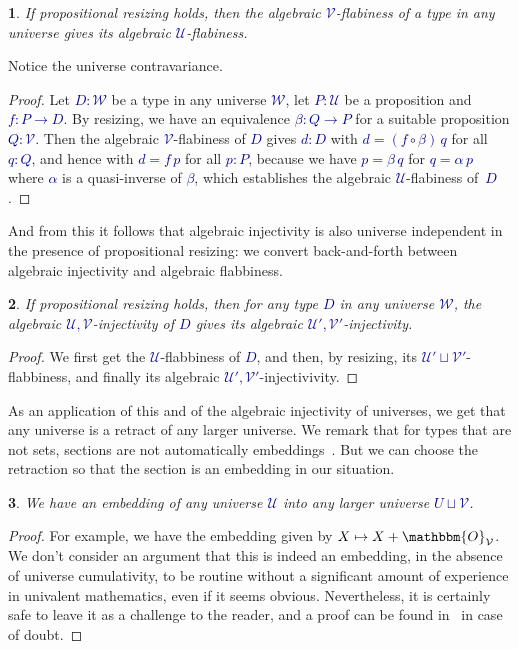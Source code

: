 \documentclass[10pt]{article}
\newcommand{\db}{\textcolor{darkblue}}
\newcommand{\m}[1]{\db{$#1$}}
\newcommand{\comp}{\mathrel{\circ}}
\newcommand{\U}{\mathcal{U}}
\newcommand{\V}{\mathcal{V}}
\newcommand{\W}{\mathcal{W}}
\newcommand{\Zero}{\mathbbm{O}}
\newtheorem{numbered}{}
\theoremstyle{definition}
\begin{document}
\begin{numbered}
  If propositional resizing holds, then the algebraic \m{\V}-flabiness
  of a type in any universe gives its algebraic \m{\U}-flabiness.
\end{numbered}
Notice the universe contravariance.
\begin{proof}
  Let \m{D:\W} be a type in any universe \m{\W}, let \m{P : \U} be a
  proposition and \m{f : P \to D}. By resizing, we have an equivalence
  \m{\beta : Q \to P} for a suitable proposition \m{Q:\V}.  Then the
  algebraic \m{\V}-flabiness of \m{D} gives \m{d:D} with \m{d = (f
    \comp \beta) \, q} for all \m{q : Q}, and hence with \m{d = f \,
    p} for all \m{p : P}, because we have \m{p=\beta \, q} for \m{q =
    \alpha \, p} where \m{\alpha} is a quasi-inverse of \m{\beta},
  which establishes the algebraic \m{\U}-flabiness of~\m{D}.
\end{proof}

And from this it follows that algebraic injectivity is also universe
independent in the presence of propositional resizing: we convert
back-and-forth between algebraic injectivity and algebraic flabbiness.

\begin{numbered}
  If propositional resizing holds, then for any type \m{D} in any universe
  \m{\W}, the algebraic \m{\U,\V}-injectivity of \m{D} gives its
  algebraic \m{\U',\V'}-injectivity.
\end{numbered}
\begin{proof}
  We first get the \m{\U}-flabbiness of \m{D}, and then, by resizing, its
  \m{\U' \sqcup \V'}-flabbiness, and finally its algebraic
  \m{\U',\V'}-injectivivity.
\end{proof}

As an application of this and of the algebraic injectivity of
universes, we get that any universe is a retract of any larger
universe.  We remark that for types that are not sets, sections are
not automatically embeddings~\cite{MR3548859}. But we can choose the
retraction so that the section is an embedding in our situation.

\begin{numbered}
  We have an embedding of any universe \m{\U} into any larger universe \m{U \sqcup \V}.
\end{numbered}
\begin{proof}
  For example, we have the embedding given by \m{X \mapsto X +
    \Zero_\V}. We don't consider an argument that this is indeed an
  embedding, in the absence of universe cumulativity, to be routine
  without a significant amount of experience in univalent mathematics,
  even if it seems obvious. Nevertheless, it is certainly safe to
  leave it as a challenge to the reader, and a proof can be found
  in~\cite{injective:article} in case of doubt.
\end{proof}
\end{document}
